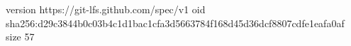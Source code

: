 version https://git-lfs.github.com/spec/v1
oid sha256:d29c3844b0c03b4c1d1bac1cfa3d5663784f168d45d36dcf8807cdfe1eafa0af
size 57
